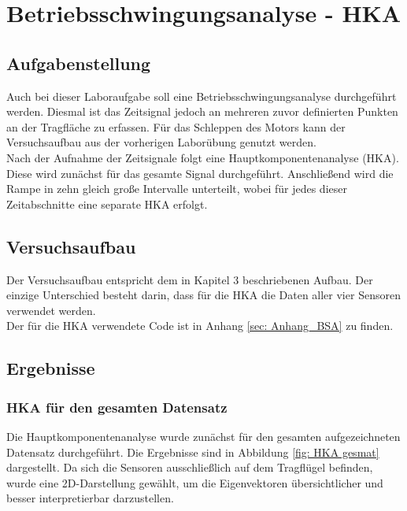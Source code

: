 \chapter{Betriebsschwingungsanalyse - HKA}
\label{sec: Hauptkapitel 3}

\section{Aufgabenstellung}
    Auch bei dieser Laboraufgabe soll eine Betriebsschwingungsanalyse durchgeführt werden. 
    Diesmal ist das Zeitsignal jedoch an mehreren zuvor definierten Punkten an der Tragfläche 
    zu erfassen. Für das Schleppen des Motors kann der Versuchsaufbau aus der vorherigen 
    Laborübung genutzt werden.
    \\

    \noindent
    Nach der Aufnahme der Zeitsignale folgt eine Hauptkomponentenanalyse (HKA). Diese wird 
    zunächst für das gesamte Signal durchgeführt. Anschließend wird die Rampe in zehn gleich 
    große Intervalle unterteilt, wobei für jedes dieser Zeitabschnitte eine separate HKA erfolgt.

\section{Versuchsaufbau}
    Der Versuchsaufbau entspricht dem in Kapitel 3 beschriebenen Aufbau. Der einzige 
    Unterschied besteht darin, dass für die HKA die Daten aller 
    vier Sensoren verwendet werden. 
    \\

    \noindent
    Der für die HKA verwendete Code ist in Anhang \ref{sec: Anhang_BSA} zu finden.

\section{Ergebnisse}
    \subsection{HKA für den gesamten Datensatz}
        Die Hauptkomponentenanalyse wurde zunächst für den gesamten aufgezeichneten
        Datensatz durchgeführt. Die Ergebnisse sind in Abbildung \ref{fig: HKA gesmat} dargestellt.
        Da sich die Sensoren ausschließlich auf dem Tragflügel befinden, wurde 
        eine 2D-Darstellung gewählt, um die Eigenvektoren übersichtlicher und besser 
        interpretierbar darzustellen.

